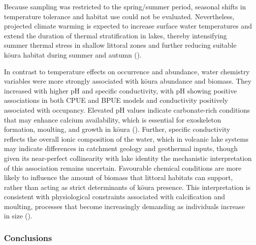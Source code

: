 \documentclass[
  letterpaper,
  DIV=11,
  numbers=noendperiod]{scrartcl}
\begin{document}
Because sampling was restricted to the spring/summer period, seasonal
shifts in temperature tolerance and habitat use could not be evaluated.
Nevertheless, projected climate warming is expected to increase surface
water temperatures and extend the duration of thermal stratification in
lakes, thereby intensifying summer thermal stress in shallow littoral
zones and further reducing suitable kōura habitat during summer and
autumn ().

In contrast to temperature effects on occurrence and abundance, water
chemistry variables were more strongly associated with kōura abundance
and biomass. They increased with higher pH and specific conductivity,
with pH showing positive associations in both CPUE and BPUE models and
conductivity positively associated with occupancy. Elevated pH values
indicate carbonate-rich conditions that may enhance calcium
availability, which is essential for exoskeleton formation, moulting,
and growth in kōura ().
Further, specific conductivity reflects the overall ionic composition of
the water, which in volcanic lake systems may indicate differences in
catchment geology and geothermal inputs, though given its near-perfect
collinearity with lake identity the mechanistic interpretation of this
association remains uncertain. Favourable chemical conditions are more
likely to influence the amount of biomass that littoral habitats can
support, rather than acting as strict determinants of kōura presence.
This interpretation is consistent with physiological constraints
associated with calcification and moulting, processes that become
increasingly demanding as individuals increase in size
().

\subsubsection{Conclusions}\label{conclusions}
\end{document}
